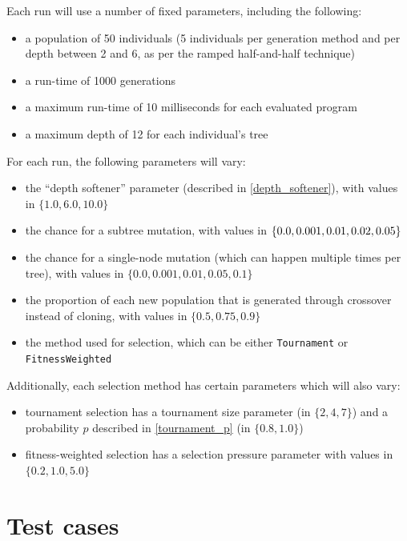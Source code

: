 \documentclass{report}
\begin{document}
Each run will use a number of fixed parameters, including the following:

\begin{itemize}
    \item a population of 50 individuals (5 individuals per generation method and per depth between 2 and 6, as per the ramped half-and-half technique)
    \item a run-time of 1000 generations
    \item a maximum run-time of 10 milliseconds for each evaluated program
    \item a maximum depth of 12 for each individual's tree
\end{itemize}

For each run, the following parameters will vary:

\begin{itemize}
    \item the ``depth softener'' parameter (described in \autoref{depth_softener}), with values in $\{1.0, 6.0, 10.0\}$
    \item the chance for a subtree mutation, with values in $\{0.0, 0.001, 0.01, \linebreak 0.02, 0.05\}$
    \item the chance for a single-node mutation (which can happen multiple times per tree), with values in $\{0.0, 0.001, 0.01, 0.05, 0.1\}$
    \item the proportion of each new population that is generated through crossover instead of cloning, with values in $\{0.5, 0.75, 0.9\}$
    \item the method used for selection, which can be either \verb|Tournament| or \linebreak
    \verb|FitnessWeighted|
\end{itemize}

Additionally, each selection method has certain parameters which will also vary:

\begin{itemize}
    \item tournament selection has a tournament size parameter (in $\{2, 4, 7\}$) and a probability $p$ described in \autoref{tournament_p} (in $\{0.8, 1.0\}$)
    \item fitness-weighted selection has a selection pressure parameter with values in $\{0.2, 1.0, 5.0\}$
\end{itemize}

\section{Test cases}
\end{document}
